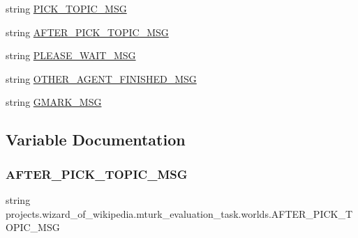 \begin{DoxyCompactItemize}
\item 
string \hyperlink{namespaceprojects_1_1wizard__of__wikipedia_1_1mturk__evaluation__task_1_1worlds_a5e3e63ac6514db908c52ed1f75c37b84}{P\+I\+C\+K\+\_\+\+T\+O\+P\+I\+C\+\_\+\+M\+SG}
\item 
string \hyperlink{namespaceprojects_1_1wizard__of__wikipedia_1_1mturk__evaluation__task_1_1worlds_ad2201283ad8cd475af9462562fa87b97}{A\+F\+T\+E\+R\+\_\+\+P\+I\+C\+K\+\_\+\+T\+O\+P\+I\+C\+\_\+\+M\+SG}
\item 
string \hyperlink{namespaceprojects_1_1wizard__of__wikipedia_1_1mturk__evaluation__task_1_1worlds_a26ab9afcb79932e864be39c0b1ca87cd}{P\+L\+E\+A\+S\+E\+\_\+\+W\+A\+I\+T\+\_\+\+M\+SG}
\item 
string \hyperlink{namespaceprojects_1_1wizard__of__wikipedia_1_1mturk__evaluation__task_1_1worlds_a6397daf1097db25da55473e7255746b0}{O\+T\+H\+E\+R\+\_\+\+A\+G\+E\+N\+T\+\_\+\+F\+I\+N\+I\+S\+H\+E\+D\+\_\+\+M\+SG}
\item 
string \hyperlink{namespaceprojects_1_1wizard__of__wikipedia_1_1mturk__evaluation__task_1_1worlds_a328bbd0be43f4fb7d26ea9cbbe8c1b2c}{G\+M\+A\+R\+K\+\_\+\+M\+SG}
\end{DoxyCompactItemize}


\subsection{Variable Documentation}
\mbox{\label{namespaceprojects_1_1wizard__of__wikipedia_1_1mturk__evaluation__task_1_1worlds_ad2201283ad8cd475af9462562fa87b97}} 
\subsubsection{\texorpdfstring{A\+F\+T\+E\+R\+\_\+\+P\+I\+C\+K\+\_\+\+T\+O\+P\+I\+C\+\_\+\+M\+SG}{AFTER\_PICK\_TOPIC\_MSG}}
{\footnotesize\ttfamily string projects.\+wizard\+\_\+of\+\_\+wikipedia.\+mturk\+\_\+evaluation\+\_\+task.\+worlds.\+A\+F\+T\+E\+R\+\_\+\+P\+I\+C\+K\+\_\+\+T\+O\+P\+I\+C\+\_\+\+M\+SG}

